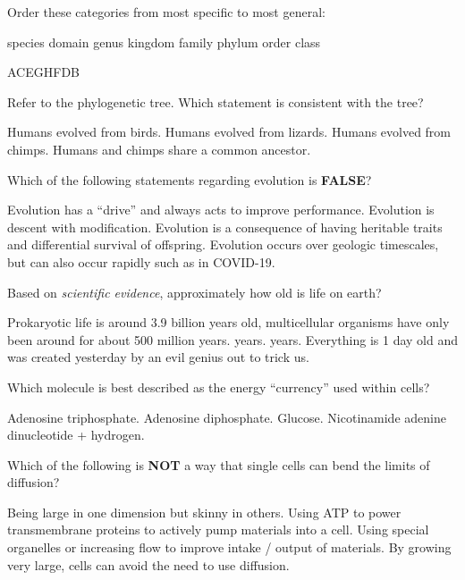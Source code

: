 \documentclass[exam,addpoints,noanswers]{exam}
\begin{document}
\begin{questions}
\question[1] Order these categories from most specific to most general:
\begin{choices}
\choice species
\choice domain
\choice genus
\choice kingdom
\choice family
\choice phylum
\choice order
\choice class
\end{choices}
\begin{solution}
ACEGHFDB
\end{solution}

\question[1] Refer to the phylogenetic tree. Which statement is consistent with the tree?
\begin{choices}
\choice Humans evolved from birds.
\choice Humans evolved from lizards.
\choice Humans evolved from chimps.
\CorrectChoice Humans and chimps share a common ancestor. 
\end{choices}

\question[1] Which of the following statements regarding evolution is \textbf{FALSE}?
\begin{choices}
\CorrectChoice Evolution has a ``drive'' and always acts to improve performance.
\choice Evolution is descent with modification.
\choice Evolution is a consequence of having heritable traits and differential survival of offspring.
\choice Evolution occurs over geologic timescales, but can also occur rapidly such as in COVID-19.
\end{choices}

\question[1] Based on \emph{scientific evidence}, approximately how old is life on earth?
\begin{choices}
\CorrectChoice Prokaryotic life is around 3.9 billion years old, multicellular organisms have only been around for about 500 million years.
 years.
 years.
\choice Everything is 1 day old and was created yesterday by an evil genius out to trick us. 
\end{choices}

\question[1] Which molecule is best described as the energy ``currency'' used within cells?
\begin{choices}
\CorrectChoice Adenosine triphosphate.
\choice Adenosine diphosphate.
\choice Glucose.
\choice Nicotinamide adenine dinucleotide + hydrogen. 
\end{choices}

\clearpage
\question[1] Which of the following is \textbf{NOT} a way that single cells can bend the limits of diffusion?
\begin{choices}
\choice Being large in one dimension but skinny in others.
\choice Using ATP to power transmembrane proteins to actively pump materials into a cell.
\choice Using special organelles or increasing flow to improve intake / output of materials. 
\CorrectChoice By growing very large, cells can avoid the need to use diffusion. 
\end{choices}


\end{questions}
\end{document}
